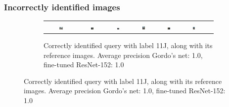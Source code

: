 \subsubsection{Incorrectly identified images}
\begin{figure}
\centering
\begin{subfigure}{\textwidth}
\begin{tabular}{|c|*{6}{c}}
\includegraphics[width=0.12\textwidth]{img/11J-0521.JPG} &
\includegraphics[width=0.12\textwidth]{img/11J-0.JPG} &
\includegraphics[width=0.12\textwidth]{img/11J-1.JPG} &
\includegraphics[width=0.12\textwidth]{img/11J-2.JPG} &
\includegraphics[width=0.12\textwidth]{img/11J-3.JPG} &
\includegraphics[width=0.12\textwidth]{img/11J-4.JPG} \\
\end{tabular}
\caption{Correctly identified query with label 11J,
along with its reference images.\newline
Average precision Gordo's net: 1.0, fine-tuned ResNet-152: 1.0
\label{fig:correct11J}}
\end{subfigure}


\end{figure}
